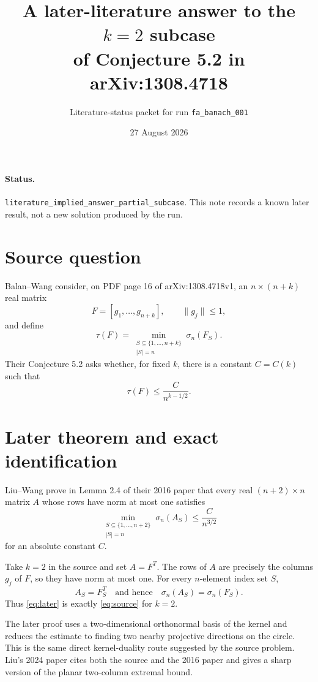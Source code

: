 \documentclass[11pt]{article}
\title{A later-literature answer to the $k=2$ subcase\\of Conjecture 5.2 in arXiv:1308.4718}
\author{Literature-status packet for run \texttt{fa\_banach\_001}}
\date{27 August 2026}
\begin{document}
\maketitle

\paragraph{Status.}
\texttt{literature\_implied\_answer\_partial\_subcase}.  This note records a
known later result, not a new solution produced by the run.

\section*{Source question}

Balan--Wang consider, on PDF page 16 of arXiv:1308.4718v1, an
$n\times(n+k)$ real matrix
\[
 F=[g_1,\ldots,g_{n+k}], \qquad \|g_j\|\le 1,
\]
and define
\[
 \tau(F)=\min_{\substack{S\subseteq\{1,\ldots,n+k\}\\|S|=n}}
 \sigma_n(F_S).
\]
Their Conjecture 5.2 asks whether, for fixed $k$, there is a constant
$C=C(k)$ such that
\begin{equation}\label{eq:source}
 \tau(F)\le \frac{C}{n^{k-1/2}}.
\end{equation}

\section*{Later theorem and exact identification}

Liu--Wang prove in Lemma 2.4 of their 2016 paper that every real
$(n+2)\times n$ matrix $A$ whose rows have norm at most one satisfies
\begin{equation}\label{eq:later}
 \min_{\substack{S\subseteq\{1,\ldots,n+2\}\\|S|=n}}
 \sigma_n(A_S)\le \frac{C}{n^{3/2}}
\end{equation}
for an absolute constant $C$.

Take $k=2$ in the source and set $A=F^T$.  The rows of $A$ are precisely
the columns $g_j$ of $F$, so they have norm at most one.  For every
$n$-element index set $S$,
\[
 A_S=F_S^T
 \quad\text{and hence}\quad
 \sigma_n(A_S)=\sigma_n(F_S).
\]
Thus \eqref{eq:later} is exactly \eqref{eq:source} for $k=2$.

The later proof uses a two-dimensional orthonormal basis of the kernel
and reduces the estimate to finding two nearby projective directions on
the circle.  This is the same direct kernel-duality route suggested by
the source problem.  Liu's 2024 paper cites both the source and the 2016
paper and gives a sharp version of the planar two-column extremal bound.
\end{document}

